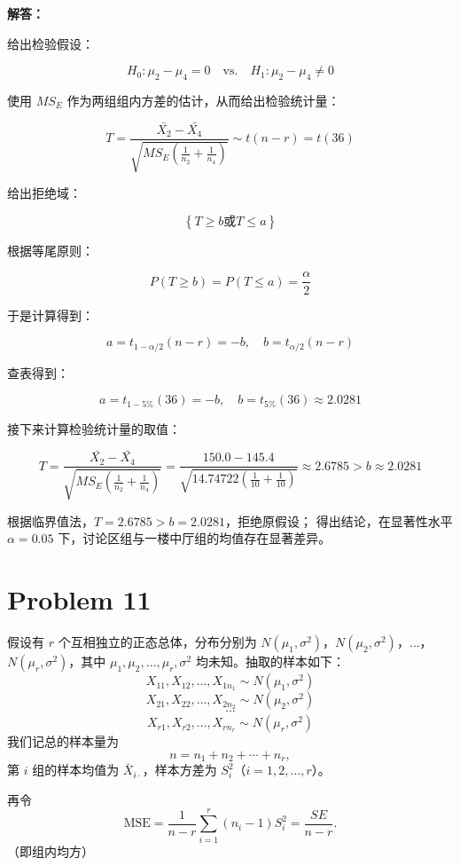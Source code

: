 \documentclass[12pt,a4paper]{article}
\begin{document}
\begin{answerbox}
\textbf{解答：}

给出检验假设：

$$
H_0: \mu_2 - \mu_4 = 0 \quad \text{vs.} \quad H_1: \mu_2 - \mu_4 \neq 0
$$

使用 $MS_E$ 作为两组组内方差的估计，从而给出检验统计量：

$$
T = \frac{\bar{X_2} - \bar{X_4}}{\sqrt{MS_E \left(\frac{1}{n_2} + \frac{1}{n_4}\right)}} \sim t(n-r) = t(36)
$$

给出拒绝域：

$$
\left\{T \geq b \text{或} T \leq a\right\}
$$

根据等尾原则：

$$
P\left(T \geq b \right) = P\left(T \leq a \right) = \frac{\alpha}{2}
$$

于是计算得到：

$$
a = t_{1-\alpha/2}(n-r)= -b, \quad b = t_{\alpha/2}(n-r)
$$

查表得到：

$$
a = t_{1-5\%}(36)= -b, \quad b = t_{5\%}(36) \approx 2.0281
$$

接下来计算检验统计量的取值：

$$
T = \frac{\bar{X_2} - \bar{X_4}}{\sqrt{MS_E \left(\frac{1}{n_2} + \frac{1}{n_4}\right)}} = \frac{150.0 - 145.4}{\sqrt{14.74722 \left(\frac{1}{10} + \frac{1}{10}\right)}} \approx 2.6785 > b \approx 2.0281
$$

根据临界值法，$T = 2.6785 > b = 2.0281$，拒绝原假设；
得出结论，在显著性水平 $\alpha=0.05$ 下，讨论区组与一楼中厅组的均值存在显著差异。

\end{answerbox}

\section{Problem 11}

假设有 $r$ 个互相独立的正态总体，分布分别为 $N(\mu_1,\sigma^2)$，$N(\mu_2,\sigma^2)$，$\ldots$，$N(\mu_r,\sigma^2)$，其中 $\mu_1,\mu_2,\ldots,\mu_r,\sigma^2$ 均未知。抽取的样本如下：
\[
X_{11},X_{12},\ldots,X_{1n_1} \sim N(\mu_1,\sigma^2)
\]
\[
X_{21},X_{22},\ldots,X_{2n_2} \sim N(\mu_2,\sigma^2)
\]
\[
\cdots
\]
\[
X_{r1},X_{r2},\ldots,X_{rn_r} \sim N(\mu_r,\sigma^2)
\]
我们记总的样本量为
\[
n=n_1+n_2+\cdots+n_r,
\]
第 $i$ 组的样本均值为 $\bar X_{i\cdot}$，样本方差为 $S_i^2$（$i=1,2,\ldots,r$）。

再令
\[
\mathrm{MSE}=\frac{1}{n-r}\sum_{i=1}^r (n_i-1)S_i^2 = \frac{SE}{n-r}.
\]
（即组内均方）
\end{document}
